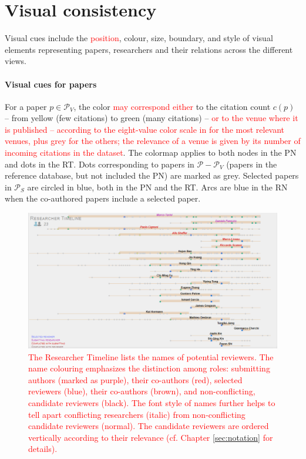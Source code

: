 \section{Visual consistency}
\label{subsec:visualvar}

Visual cues include the \textcolor{red}{position}, colour, size, boundary, and style of visual elements representing papers, researchers and their relations across the different views.  

\paragraph*{Visual cues for papers} 
For a paper $p \in \mathcal{P}_{V}$, the color \textcolor{red}{may correspond either} to the citation count $c(p)$ -- from yellow (few citations) to green (many citations) -- \textcolor{red}{or to the venue where it is published -- according to the eight-value color scale in \cite{Wa13} for the most relevant venues, plus grey for the others; the relevance of a venue is given by its number of incoming citations in the dataset}. The colormap applies to both nodes in the PN and dots in the RT. Dots corresponding to papers in $\mathcal{P} - \mathcal{P}_V$ (papers in the reference database, but not included the PN) are marked as grey. 
Selected papers in $\mathcal{P}_S$ are circled in blue, both in the PN and the RT.  Arcs are blue in the RN when the co-authored papers include a selected paper.  


\begin{figure}[!t]
    \centering
    \includegraphics[width=\textwidth]{fig/timeline_cropped.png}
    \caption{\textcolor{red}{The Researcher Timeline lists the names of potential reviewers. The name colouring emphasizes the distinction among roles: submitting authors (marked as purple), their co-authors (red), selected reviewers (blue), their co-authors (brown), and non-conflicting, candidate reviewers (black). The font style of names further helps to tell apart conflicting researchers (italic) from non-conflicting candidate reviewers (normal). The \textcolor{red}{candidate reviewers} are ordered vertically according to their relevance (cf. Chapter \ref{sec:notation} for details).}}%
    \label{fig:selected}
\end{figure}



